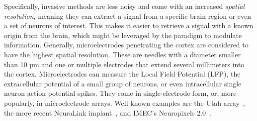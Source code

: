 
Specifically, invasive methods are less noisy and come with an increased \emph{spatial
resolution}, meaning they can extract a signal from a specific brain region or even a
set of neurons of interest.
This makes it easier to retrieve a signal with a known origin from the brain, which
might be leveraged by the paradigm to modulate information.
Generally, microelectrodes penetrating the cortex are considered to have the highest
spatial resolution.
These are needles with a diameter smaller than 10 µm and one or multiple electrodes that
extend several millimeters into the cortex.
Microelectrodes can measure the Local Field Potential (LFP), the extracellular potential
of a small group of neurons,
or even intracellular single neuron action potential
spikes.
They come in single-electrode form, or, more popularly, in microelectrode arrays.
Well-known examples are the Utah array~\cite{Maynard1997}, the more recent NeuraLink
implant~\cite{Musk2019}, and IMEC's Neuropixels 2.0~\cite{Steinmetz2021}.

